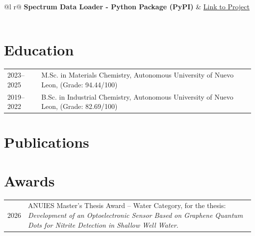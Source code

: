 \documentclass[a4paper,12pt]{article}
\begin{document}
\begin{tabularx}{\linewidth}{ @{}l r@{} }
\textbf{Spectrum Data Loader - Python Package (PyPI)} & \hfill \href{https://pypi.org/project/spectrum-data-loader/0.1.0/}{Link to Project} \\[3.75pt]
  \\
\end{tabularx}
  
\section{Education}
\begin{tabularx}{\linewidth}{@{}l X@{} }
2023–2025 & M.Sc. in Materials Chemistry, Autonomous University of Nuevo Leon, (Grade: 94.44/100) \\
2019–2022 & B.Sc. in Industrial Chemistry, Autonomous University of Nuevo Leon, (Grade: 82.69/100) \\
\end{tabularx}

\section{Publications}
\begin{refsection}
\nocite{*}
\printbibliography[heading=none]
\end{refsection}

\section{Awards}
\begin{tabularx}{\linewidth}{@{}l X@{}}
2026 & ANUIES Master's Thesis Award -- Water Category, for the thesis: \textit{Development of an Optoelectronic Sensor Based on Graphene Quantum Dots for Nitrite Detection in Shallow Well Water}. \\
\end{tabularx}
\end{document}
